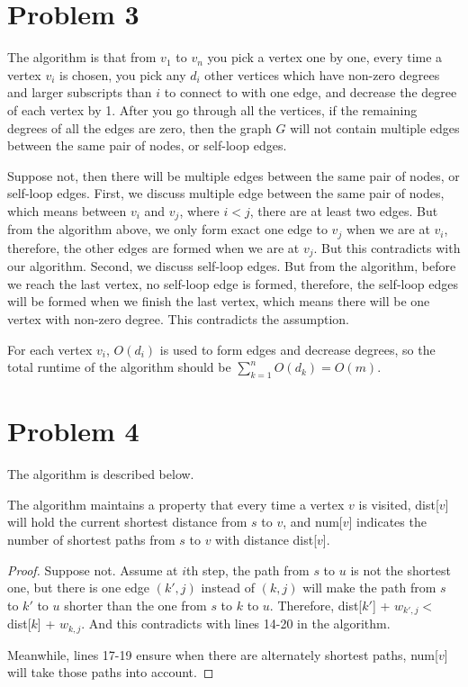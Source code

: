\documentclass[a4paper,12pt]{article}
\begin{document}
\section*{Problem 3}
The algorithm is that from $v_1$ to $v_n$ you pick a vertex one by one,
every time a vertex $v_i$ is chosen, you pick any $d_i$ other vertices
which have non-zero degrees and larger subscripts than $i$ to connect 
to with one edge, and decrease the degree of each vertex by 1. After you
go through all the vertices, if the remaining degrees of all the edges are
zero, then the graph $G$ will not contain multiple edges between the
same pair of nodes, or self-loop edges.

Suppose not, then there will be multiple edges between the same pair of 
nodes, or self-loop edges. First, we discuss multiple edge between the 
same pair of nodes, which means between $v_i$ and $v_j$, where $i < 
j$, there are at least two edges. But from the algorithm above, we only 
form exact one edge to $v_j$ when we are at $v_i$, therefore, the other
edges are formed when we are at $v_j$. But this contradicts with our
algorithm. Second, we discuss self-loop edges. But from the algorithm, 
before we reach the last vertex, no self-loop edge is formed, therefore, 
the self-loop edges will be formed when we finish the last vertex, which
means there will be one vertex with non-zero degree. This contradicts
the assumption.

For each vertex $v_i$, $O(d_i)$ is used to form edges and decrease 
degrees, so the total runtime of the algorithm should be 
$\sum\limits_{k=1}^n O(d_k) = O(m)$.
\clearpage
\section*{Problem 4}
The algorithm is described below. 

The algorithm maintains a property that every time a vertex $v$ is 
visited, dist[$v$] will hold the current shortest distance from $s$ to
$v$, and num[$v$] indicates the number of shortest paths from $s$
to $v$ with distance dist[$v$].


%
\begin{proof}
Suppose not. Assume at $i$th step, the path from $s$ to $u$ is not
the shortest one, but there is one edge $(k', j)$ instead of $(k, j)$ will
make the path from $s$ to $k'$ to $u$ shorter than the one from $s$
to $k$ to $u$. Therefore, dist[$k'$] + $w_{k',j} <$ dist[$k$] + $w_{k,j}$.
And this contradicts with lines 14-20 in the algorithm.

Meanwhile, lines 17-19 ensure when there are alternately shortest paths,
num[$v$] will take those paths into account. 
\end{proof}
\end{document}
